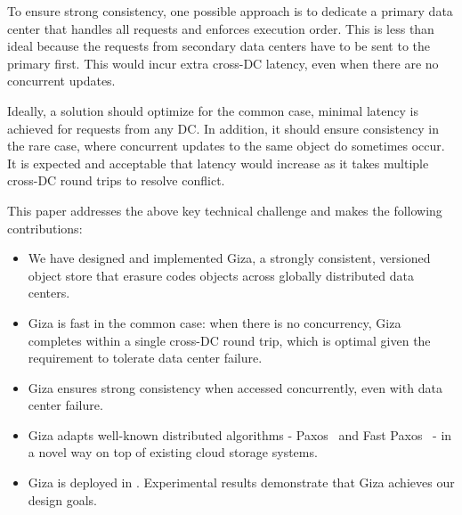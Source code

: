 To ensure strong consistency, one possible approach is to dedicate a primary
data center that handles all requests and enforces execution order. This is less
than ideal because the requests from secondary data centers have to be sent to
the primary first. This would incur extra cross-DC latency, even when there are
no concurrent updates.

 Ideally, a solution should optimize for the
common case, minimal latency is achieved for requests from any DC. In addition,
it should ensure consistency in the rare case, where concurrent updates to the
same object do sometimes occur. It is expected and acceptable that latency would
increase as it takes multiple cross-DC round trips to resolve conflict.


This paper addresses the above key technical challenge and makes the following contributions:
\begin{itemize}
    \item We have designed and implemented Giza, a strongly consistent,
      versioned object store that erasure codes objects across globally
      distributed data centers.
    \item Giza is fast in the common case: when there is no concurrency, Giza
      completes within a single cross-DC round trip, which is optimal given the
      requirement to tolerate data center failure.
    \item Giza ensures strong consistency when accessed concurrently, even with data center
      failure.
    \item Giza adapts well-known distributed algorithms - Paxos~\cite{lamport01paxos}
      and Fast Paxos~\cite{lamport05fast} - in a novel way on top of existing cloud storage systems.
    \item Giza is deployed in \deployment. Experimental results demonstrate
      that Giza achieves our design goals. %
\end{itemize}

